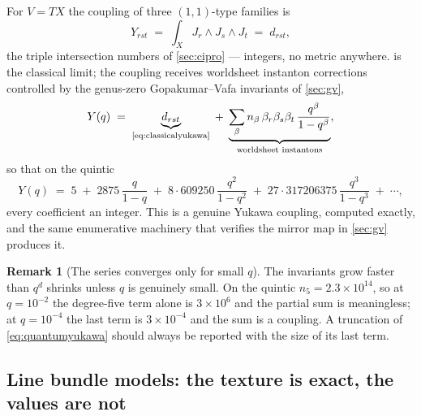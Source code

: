 \documentclass[11pt,a4paper]{article}
\theoremstyle{definition}
\newtheorem{remark}{Remark}
\begin{document}
For $V = TX$ the coupling of three $(1,1)$-type families is
%
\begin{equation}
Y_{rst} \;=\; \int_X J_r \wedge J_s \wedge J_t \;=\; d_{rst} ,
\label{eq:classicalyukawa}
\end{equation}
%
the triple intersection numbers of \cref{sec:cipro} --- integers, no metric
anywhere.  is the classical limit; the coupling
receives worldsheet instanton corrections controlled by the genus-zero
Gopakumar--Vafa invariants of \cref{sec:gv},
%
\begin{equation}
Y(q) \;=\;
\underbrace{d_{rst}}_{\text{\cref{eq:classicalyukawa}}}
\;+\;
\underbrace{\sum_{\beta} n_\beta\, \beta_r \beta_s \beta_t\,
\frac{q^{\beta}}{1 - q^{\beta}}}_{\text{worldsheet instantons}} ,
\label{eq:quantumyukawa}
\end{equation}
%
so that on the quintic
%
\begin{equation}
Y(q) \;=\; 5 \;+\; 2875\,\frac{q}{1-q}
\;+\; 8 \cdot 609250\, \frac{q^2}{1-q^2}
\;+\; 27 \cdot 317206375\, \frac{q^3}{1-q^3} \;+\; \cdots ,
\end{equation}
%
every coefficient an integer. This is a genuine Yukawa coupling, computed
exactly, and the same enumerative machinery that verifies the mirror map in
\cref{sec:gv} produces it.

\begin{remark}[The series converges only for small $q$]
The invariants grow faster than $q^d$ shrinks unless $q$ is genuinely small.
On the quintic $n_5 = 2.3\times10^{14}$, so at $q = 10^{-2}$ the degree-five
term alone is $3\times10^{6}$ and the partial sum is meaningless; at
$q = 10^{-4}$ the last term is $3\times10^{-4}$ and the sum is a coupling.
A truncation of \cref{eq:quantumyukawa} should always be reported with the
size of its last term.
\end{remark}

\subsection{Line bundle models: the texture is exact, the values are not}
\end{document}
